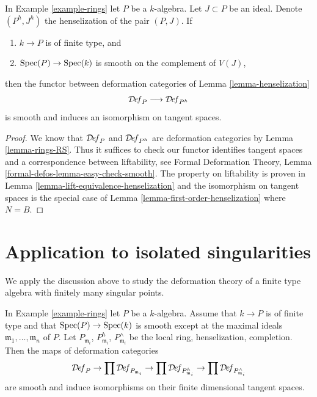 \begin{lemma}
\label{lemma-smooth-henselization}
In Example \ref{example-rings} let $P$ be a $k$-algebra.
Let $J \subset P$ be an ideal.
Denote $(P^h, J^h)$ the henselization of the pair $(P, J)$. If
\begin{enumerate}
\item $k \to P$ is of finite type, and
\item $\mathop{\mathrm{Spec}}(P) \to \mathop{\mathrm{Spec}}(k)$ is smooth on the complement of $V(J)$,
\end{enumerate}
then the functor between deformation categories of
Lemma \ref{lemma-henselization}
$$
\mathcal{D}\!\mathit{ef}_P \longrightarrow \mathcal{D}\!\mathit{ef}_{P^h}
$$
is smooth and induces an isomorphism on tangent spaces.
\end{lemma}

\begin{proof}
We know that $\mathcal{D}\!\mathit{ef}_P$ and $\mathcal{D}\!\mathit{ef}_{P^h}$
are deformation categories by Lemma \ref{lemma-rings-RS}.
Thus it suffices to check
our functor identifies tangent spaces and a correspondence
between liftability, see
Formal Deformation Theory, Lemma \ref{formal-defos-lemma-easy-check-smooth}.
The property on liftability is proven in
Lemma \ref{lemma-lift-equivalence-henselization}
and the isomorphism on tangent spaces is the special case of
Lemma \ref{lemma-first-order-henselization} where $N = B$.
\end{proof}



\section{Application to isolated singularities}
\label{section-isolated}

\noindent
We apply the discussion above to study the deformation theory
of a finite type algebra with finitely many singular points.

\begin{lemma}
\label{lemma-isolated}
In Example \ref{example-rings} let $P$ be a $k$-algebra.
Assume that $k \to P$ is of finite type and that $\mathop{\mathrm{Spec}}(P) \to \mathop{\mathrm{Spec}}(k)$
is smooth except at the maximal ideals
$\mathfrak m_1, \ldots, \mathfrak m_n$ of $P$.
Let $P_{\mathfrak m_i}$, $P_{\mathfrak m_i}^h$, $P_{\mathfrak m_i}^\wedge$
be the local ring, henselization, completion.
Then the maps of deformation categories
$$
\mathcal{D}\!\mathit{ef}_P \to
\prod \mathcal{D}\!\mathit{ef}_{P_{\mathfrak m_i}} \to
\prod \mathcal{D}\!\mathit{ef}_{P_{\mathfrak m_i}^h} \to
\prod \mathcal{D}\!\mathit{ef}_{P_{\mathfrak m_i}^\wedge}
$$
are smooth and induce isomorphisms on their finite dimensional
tangent spaces.
\end{lemma}

